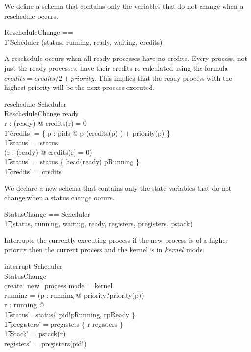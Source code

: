 \documentclass{article}
\begin{document}
We define a schema that contains only the variables that do not change
when a reschedule occurs.

\begin{zed}
  RescheduleChange == \\
    \t1 Scheduler \hide (status, running, ready, waiting, credits)
\end{zed}

A reschedule occurs when all ready processes have no credits. Every
process, not just the ready processes, have their credits
re-calculated using the formula $credits = credits/2 + priority$. This
implies that the ready process with the highest priority will be the
next process executed.

\begin{schema}{reschedule}
  \Delta Scheduler\\
  \Xi RescheduleChange
\where
  ready \neq \emptyset\\
  \forall r : \ran(ready) @ credits(r) = 0 \implies\\
    \t1 credits' =
      \{ p : pids @ p \mapsto (credits(p) ) + priority(p) \} \land\\
    \t1 status' = status\\
  \lnot (\forall r : \ran(ready) @ credits(r) = 0) \implies\\
    \t1 status' = status \oplus \{ head(ready) \mapsto pRunning \} \land\\ 
    \t1 credits' = credits
\end{schema}

We declare a new schema that contains only the state variables that do
not change when a status change occurs.

\begin{zed}
  StatusChange == Scheduler \hide\\
    \t1 (status, running, waiting, ready, registers, pregisters, pstack)
\end{zed}

Interrupts the currently executing process if the new process is of a
higher priority then the current process and the kernel is in $kernel$
mode.

\begin{schema}{interrupt}
  \Delta Scheduler\\
  \Xi StatusChange\\
  create\_new\_process
\where
  mode = kernel\\
  running = \emptyset\lor(\exists p : running @ priority?\geq priority(p))\\
  \exists r : running @\\
    \t1 status'=status\oplus\{ pid!\mapsto pRunning, r\mapsto pReady \}\land\\
    \t1 pregisters' = pregisters \oplus \{ r \mapsto registers \} \land\\
    \t1 \theta Stack' = pstack(r)\\
  registers' = pregisters(pid!)
\end{schema}
\end{document}
